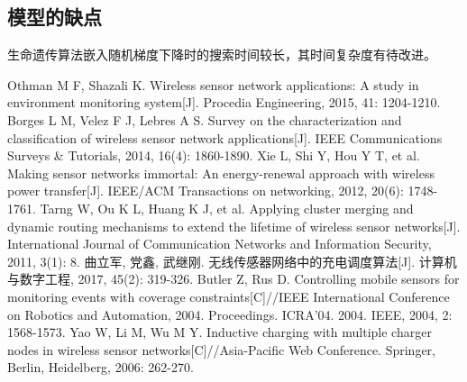 \documentclass{whutmod}
\begin{document}
		\subsection{模型的缺点}
 			生命遗传算法嵌入随机梯度下降时的搜索时间较长，其时间复杂度有待改进。

  
  
 
	\newpage	%
	\nocite{*}		%
	\begin{thebibliography}{9}%
		Othman M F, Shazali K. Wireless sensor network applications: A study in environment monitoring system[J]. Procedia Engineering, 2015, 41: 1204-1210.
		Borges L M, Velez F J, Lebres A S. Survey on the characterization and classification of wireless sensor network applications[J]. IEEE Communications Surveys \& Tutorials, 2014, 16(4): 1860-1890.
		Xie L, Shi Y, Hou Y T, et al. Making sensor networks immortal: An energy-renewal approach with wireless power transfer[J]. IEEE/ACM Transactions on networking, 2012, 20(6): 1748-1761.
		Tarng W, Ou K L, Huang K J, et al. Applying cluster merging and dynamic routing mechanisms to extend the lifetime of wireless sensor networks[J]. International Journal of Communication Networks and Information Security, 2011, 3(1): 8.
		曲立军, 党鑫, 武继刚. 无线传感器网络中的充电调度算法[J]. 计算机与数字工程, 2017, 45(2): 319-326.
		Butler Z, Rus D. Controlling mobile sensors for monitoring events with coverage constraints[C]//IEEE International Conference on Robotics and Automation, 2004. Proceedings. ICRA'04. 2004. IEEE, 2004, 2: 1568-1573.
		Yao W, Li M, Wu M Y. Inductive charging with multiple charger nodes in wireless sensor networks[C]//Asia-Pacific Web Conference. Springer, Berlin, Heidelberg, 2006: 262-270.
	
	\end{thebibliography}
%
%			
%			
\end{document}
